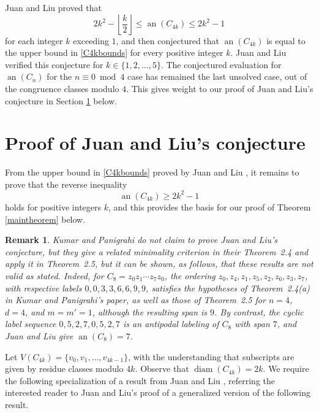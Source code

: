 \documentclass[10pt,a4paper]{amsart}
\newtheorem{remark}{Remark}
\begin{document}
 Juan and Liu \cite[Theorem 9]{JuanLiu2012} proved that 
\begin{equation}\label{C4kbounds}
 2k^2 - \left\lfloor \frac{k}{2} \right\rfloor \leq \operatorname{an}(C_{4k}) \leq 2k^2 - 1 
\end{equation}
 for each integer $k$ exceeding $1$, and then conjectured \cite[Conjecture 1]{JuanLiu2012} that $\operatorname{an}(C_{4k}) $ is equal to 
 the upper bound in \eqref{C4kbounds} for every positive integer $k$. Juan and Liu verified this conjecture for $k \in \{ 1, 2, \ldots, 5 \}$. 
 The conjectured evaluation for $\operatorname{an}(C_{n})$ for the $n \equiv 0 \bmod {4}$ case has remained the last unsolved case, out 
 of the congruence classes modulo $4$. 
 This gives weight to our 
 proof of Juan and Liu's conjecture in Section \ref{secmain} below. 
 
\section{Proof of Juan and Liu's conjecture}\label{secmain}
 From the upper bound in \eqref{C4kbounds} proved by Juan and Liu \cite[Theorem 9]{JuanLiu2012}, it remains to prove that the 
 reverse inequality
\begin{equation}\label{displayreverse} 
 \operatorname{an}(C_{4k}) \geq 2k^2 - 1
\end{equation}
 holds for positive integers $k$, 
 and this provides the basis for our proof of Theorem \ref{maintheorem} below. 

\begin{remark}\label{correction}
 Kumar and Panigrahi \cite{KumarPanigrahi2026} do not claim to prove Juan and Liu's conjecture, 
 but they give a related minimality criterion in their Theorem~2.4 and apply it in Theorem~2.5, 
 but it can be shown, as follows, that these results are not valid as stated. Indeed, for \(C_{8}=z_{0}z_{1}\cdots z_{7}z_{0}\), the 
 ordering \(z_{0},z_{4},z_{1},z_{5},z_{2},z_{6},z_{3},z_{7}\), with respective labels \(0,0,3,3,6,6,9,9\), satisfies the hypotheses of Theorem~2.4(a) 
 in Kumar and Panigrahi's paper, 
 as well as those of Theorem~2.5 for \(n=4\), \(d=4\), and \(m=m'=1\), although the resulting span is \(9\). By contrast, the cyclic label sequence \(0,5,2,7,0,5,2,7\) is an antipodal labeling of \(C_{8}\) with span \(7\), and Juan and Liu \cite[Theorem~9]{JuanLiu2012} give \(\operatorname{an}(C_{8})=7\).
\end{remark}

 Let $V(C_{4k}) = \{ v_{0}, v_{1}, \ldots, v_{4k-1} \}$, 
 with the understanding that subscripts are given by residue classes modulo $4k$. 
          Observe that $\operatorname{diam}(C_{4k}) = 2k$. We require 
 the following specialization of 
 a result from Juan and Liu \cite[Proposition 1]{JuanLiu2012}, 
 referring the interested reader to Juan and Liu's proof of a generalized version of the following result. 
\end{document}
